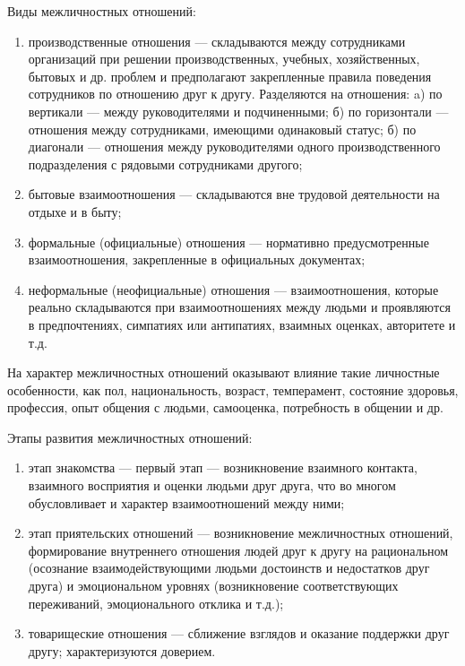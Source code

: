 Виды межличностных отношений:
\begin{enumerate}
	\item производственные отношения — складываются между сотрудниками организаций при решении производственных, учебных, хозяйственных, бытовых и др. проблем и предполагают закрепленные правила поведения сотрудников по отношению друг к другу. Разделяются на отношения:
		\subitem a) по вертикали — между руководителями и подчиненными;
		\subitem б) по горизонтали — отношения между сотрудниками, имеющими одинаковый статус;
		\subitem б) по диагонали — отношения между руководителями одного производственного подразделения с рядовыми сотрудниками другого;
	\item бытовые взаимоотношения — складываются вне трудовой деятельности на отдыхе и в быту;
	\item формальные (официальные) отношения — нормативно предусмотренные взаимоотношения, закрепленные в официальных документах;
	\item неформальные (неофициальные) отношения — взаимоотношения, которые реально складываются при взаимоотношениях между людьми и проявляются в предпочтениях, симпатиях или антипатиях, взаимных оценках, авторитете и т.д.
\end{enumerate}

На характер межличностных отношений оказывают влияние такие личностные особенности, как пол, национальность, возраст, темперамент, состояние здоровья, профессия, опыт общения с людьми, самооценка, потребность в общении и др.

Этапы развития межличностных отношений:
\begin{enumerate}
	\item этап знакомства — первый этап — возникновение взаимного контакта, взаимного восприятия и оценки людьми друг друга, что во многом обусловливает и характер взаимоотношений между ними;
	\item этап приятельских отношений — возникновение межличностных отношений, формирование внутреннего отношения людей друг к другу на рациональном (осознание взаимодействующими людьми достоинств и недостатков друг друга) и эмоциональном уровнях (возникновение соответствующих переживаний, эмоционального отклика и т.д.);
	\item товарищеские отношения — сближение взглядов и оказание поддержки друг другу; характеризуются доверием.
\end{enumerate}